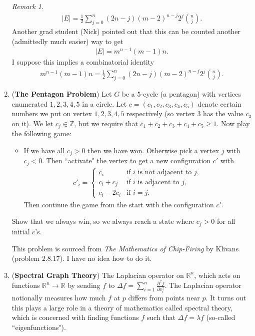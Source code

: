\documentclass{article}
\newcommand{\question}[1]{\item (\textbf{#1})}
\theoremstyle{remark}
\newtheorem*{remark}{Remark}
\begin{document}
\begin{enumerate}
\begin{remark}
\begin{align*}
            |E| = \frac{1}{2} \sum_{j=0}^n (2n - j) (m-2)^{n-j} 2^j \binom{n}{j}.
        \end{align*}
        Another grad student (Nick) pointed out that this can be counted another (admittedly much easier) way to get
        \begin{align*}
            |E| = m^{n-1} (m-1) n.
        \end{align*}
        I suppose this implies a combinatorial identity
        \begin{align*}
            m^{n-1} (m-1) n = \frac{1}{2} \sum_{j=0}^n (2n - j) (m-2)^{n-j} 2^j \binom{n}{j}.
        \end{align*}
    \end{remark}
    \question{The Pentagon Problem}
    Let $G$ be a $5$-cycle (a pentagon) with vertices enumerated $1 ,2,3,4,5$ in a circle. Let $c = (c_1 , c_2, c_3, c_4, c_5)$ denote certain numbers we put on vertex $1,2,3,4,5$ respectively (so vertex $3$ has the value $c_3$ on it). We let $c_j \in \mathbb{Z}$, but we require that $c_1 + c_2 + c_3 + c_4 + c_5 \geq 1$. Now play the following game:
    \begin{itemize}
        \item[] If we have all $c_j>0$ then we have won. Otherwise pick a vertex $j$ with $c_j < 0$. Then ``activate" the vertex to get a new configuration $c'$ with
        \begin{align*}
            c'_i = \begin{cases}
                c_i & \text{if $i$ is not adjacent to $j$},\\
                c_{i} + c_j & \text{if $i$ is adjacent to $j$},\\
                c_{i} - 2c_i & \text{if $i = j$}.
            \end{cases}
        \end{align*}
        Then continue the game from the start with the configuration $c'$.
    \end{itemize}
    Show that we always win, so we always reach a state where $c_j > 0$ for all initial $c$'s.

    This problem is sourced from \textit{The Mathematics of Chip-Firing} by Klivans (problem $2.8.17$). I have no idea how to do it.
    \question{Spectral Graph Theory}
    The Laplacian operator on $\mathbb{R}^n$, which acts on functions $\mathbb{R}^n \to \mathbb{R}$ by sending $f$ to $\Delta f = \sum_{i = 1}^n \frac{\partial^2 f}{\partial x_i^2}$. The Laplacian operator notionally measures how much $f$ at $p$ differs from points near $p$. It turns out this plays a large role in a theory of mathematics called spectral theory, which is concerned with finding functions $f$ such that $\Delta f = \lambda f$ (so-called ``eigenfunctions").


\end{enumerate}
\end{document}
